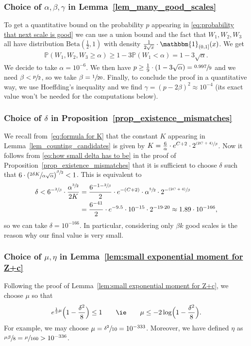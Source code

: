 \documentclass[JEP,XML,SOM,Unicode,NoFloatCountersInSection,published]{cedram}
\newcommand{\psfrac}[2]{\sfrac{(#1)}{#2}}
\newcommand{\Pp}[1]{\mathbb{P} \left(#1\right)}
\newcommand{\intervalle}[4]{\mathopen{#1}#2\mathclose{}\mathpunct{},#3\mathclose{#4}}
\newcommand{\intervalleof}[2]{\intervalle{(}{#1}{#2}{]}}
\theoremstyle{plain}
\theoremstyle{definition}
\begin{document}
\subsubsection*{Choice of $\alpha,\beta,\gamma$ in Lemma~\ref{lem_many_good_scales}}
To get a quantitative bound on the probability $p$ appearing in \eqref{eq:probability that next scale is good} we can use a union bound and the fact that $W_1, W_2,W_3$ all have distribution $\mathrm{Beta}(\frac{1}{2},1)$ with density $\frac{1}{2\sqrt{x}}\cdot \mathbbm{1}_{\intervalleof{0}{1}}(x)$. We get
\begin{align*}
\Pp{W_1, W_2,W_3 \geq \alpha} \geq 1 - 3 \Pp{W_1 <\alpha} = 1 - 3\sqrt{\alpha}.
\end{align*}
We decide to take $\alpha = 10^{-6}$. We then have $p\geq \frac{1}{9}\cdot (1 - 3\sqrt{\alpha})=\sfrac{0.997}{9}$ and we need $\beta< \sfrac{p}{2}$, so we take $\beta=\sfrac{1}{20}$.
Finally, to conclude the proof in a quantitative way, we use Hoeffding's inequality and we find $\gamma=(p-2\beta)^2 \approx 10^{-4}$ (its exact value won't be needed for the computations below).

\subsubsection*{Choice of $\delta$ in Proposition~\ref{prop_existence_mismatches}}
We recall from~\eqref{eq:formula for K} that the constant $K$ appearing in Lemma~\ref{lem_counting_candidates} is
given by $K=\frac{6}{\alpha} \cdot e^{C+2} \cdot 2^{\psfrac{2C+4}{\beta}}$.
Now it follows from \eqref{eq:how small delta has to be} in the proof of Proposition~\ref{prop_existence_mismatches} that it is sufficient to choose $\delta$ such that
$6 \cdot \left( \sfrac{2\delta K}{\alpha\sqrt{\alpha}} \right)^{\sfrac{\beta}{2}}<1$.
This is equivalent to
\begin{align*}
\delta < 6^{-\sfrac{2}{\beta}}\cdot\frac{\alpha^{\sfrac{3}{2}}}{2 K}&= \frac{6^{-1-\sfrac{2}{\beta}}}{2}\cdot e^{-(C+2)}\cdot \alpha^{\sfrac{5}{2}} \cdot 2^{-\psfrac{2C+4}{\beta}}
\\&= \frac{6^{-41}}{2} \cdot e^{-9.5}\cdot 10^{-15} \cdot 2^{-19\cdot 20} \approx 1.89 \cdot 10^{-166},
\end{align*}
so we can take $\delta = 10^{-166}$. In particular, considering only $\beta k$ good scales is the reason why our final value is very small.

\subsubsection*{Choice of $\mu, \eta$ in Lemma~\ref{lem:small exponential moment for Z+c}}
Following the proof of Lemma~\ref{lem:small exponential moment for Z+c}, we choose $\mu$ so that
\begin{align*}
e^{\frac12 \mu} \Bigl( 1-\frac{\delta^2}{8} \Bigr) \leq 1 \qquad \text{\ie} \qquad \mu \leq -2 \log \Bigl( 1-\frac{\delta^2}{8} \Bigl).
\end{align*}
For example, we may choose $\mu = \sfrac{\delta^2}{10}=10^{-333}$. Moreover, we have defined $\eta$ as $\sfrac{\mu \beta}{8}=\sfrac{\mu}{160}>10^{-336}$.
\end{document}
